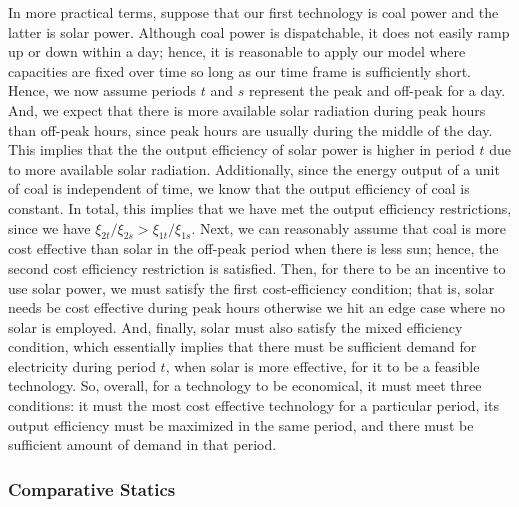 \documentclass[11pt,a4paper]{extarticle}
\begin{document}
In more practical terms, suppose that our first technology is coal power and the latter is solar power. Although coal power is dispatchable, it does not easily ramp up or down within a day; hence, it is reasonable to apply our model where capacities are fixed over time so long as our time frame is sufficiently short. Hence, we now assume periods $t$ and $s$ represent the peak and off-peak for a day. And, we expect that there is more available solar radiation during peak hours than off-peak hours, since peak hours are usually during the middle of the day. This implies that the the output efficiency of solar power is higher in period $t$ due to more available solar radiation. Additionally, since the energy output of a unit of coal is independent of time, we know that the output efficiency of coal is constant. In total, this implies that we have met the output efficiency restrictions, since we have $\xi_{2t}/\xi_{2s} > \xi_{1t}/\xi_{1s}$. Next, we can reasonably assume that coal is more cost effective than solar in the off-peak period when there is less sun; hence, the second cost efficiency restriction is satisfied. Then, for there to be an incentive to use solar power, we must satisfy the first cost-efficiency condition; that is, solar needs be cost effective during peak hours otherwise we hit an edge case where no solar is employed. And, finally, solar must also satisfy the mixed efficiency condition, which essentially implies that there must be sufficient demand for electricity during period $t$, when solar is more effective, for it to be a feasible technology. So, overall, for a technology to be economical, it must meet three conditions: it must the most cost effective technology for a particular period, its output efficiency must be maximized in the same period, and there must be sufficient amount of demand in that period. 



\subsubsection{Comparative Statics}
\end{document}
